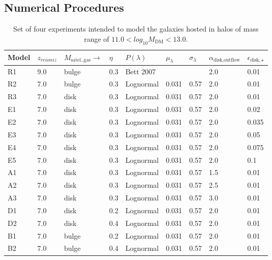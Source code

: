 \documentclass[usenatbib]{mn2e}
\begin{document}
\subsection{Numerical Procedures}
\label{sec:method:numericals}
\begin{table}\tiny
\centering
\resizebox{7in}{!} {
\begin{tabular}{|l|l|l|l|l|l|l|l|l|}
\hline
\hline
Model  &  $z_{reioniz}$ &  $M_{\text{satel.,gas}}\to$  & $\eta$ & $P(\lambda)$  &  $\mu_\lambda$
 & $\sigma_\lambda$  & $\alpha_{\text{disk,outflow}}$ & $\epsilon_{\text{disk},\star}$ \\
\hline
\hline
R1 & 9.0 &  bulge & 0.3 &Bett 2007 & &  & 2.0 & 0.01 \\
R2 & 7.0 &  bulge & 0.3 &Lognormal & 0.031 & 0.57 & 2.0 & 0.01 \\
R3 & 7.0 &  disk & 0.3 &Lognormal & 0.031  & 0.57 & 2.0 & 0.01 \\
\hline
E1 & 7.0 &  disk & 0.3 &Lognormal & 0.031 & 0.57 & 2.0 & 0.02 \\
E2 & 7.0 &  disk & 0.3 &Lognormal & 0.031 & 0.57 & 2.0 & 0.035 \\
E3 & 7.0 &  disk & 0.3 &Lognormal & 0.031 & 0.57 & 2.0 & 0.05 \\
E4 & 7.0 &  disk & 0.3 &Lognormal & 0.031 & 0.57 & 2.0 & 0.075 \\
E5 & 7.0 &  disk & 0.3 &Lognormal & 0.031 & 0.57 & 2.0 & 0.1 \\
\hline
A1 & 7.0 &  disk & 0.3 &Lognormal & 0.031 & 0.57 & 1.5 & 0.01 \\
A2 & 7.0 &  disk & 0.3 &Lognormal & 0.031 & 0.57 & 2.5 & 0.01 \\
A3 & 7.0 &  disk & 0.3 &Lognormal & 0.031 & 0.57 & 3.0 & 0.01 \\
\hline
D1 & 7.0 &  disk & 0.2 &Lognormal & 0.031 & 0.57 & 2.0 & 0.01 \\
D2 & 7.0 &  disk & 0.4 &Lognormal & 0.031 & 0.57 & 2.0 & 0.01 \\
\hline
B1 & 7.0 &  bulge & 0.2 &Lognormal & 0.031 & 0.57 & 2.0 & 0.01 \\
B2 & 7.0 &  bulge & 0.4 &Lognormal & 0.031 & 0.57 & 2.0 & 0.01 \\
\hline
\hline
\end{tabular}
}
\caption{Set of four experiments intended to model the galaxies hosted in  halos of mass range of $11.0<log_{10} M_{\text{DM}}<13.0$.\label{tab:runs}}
\end{table}
\end{document}
